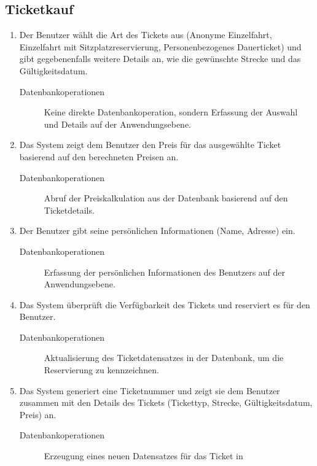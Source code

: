 \subsection{Ticketkauf}
\begin{enumerate}
    \item Der Benutzer wählt die Art des Tickets aus (Anonyme Einzelfahrt, Einzelfahrt mit
    Sitzplatzreservierung, Personenbezogenes Dauerticket) und gibt gegebenenfalls
    weitere Details an, wie die gewünschte Strecke und das Gültigkeitsdatum.
        \begin{description}
            \item[Datenbankoperationen] Keine direkte Datenbankoperation, sondern Erfassung
            der Auswahl und Details auf der Anwendungsebene.
        \end{description}
    \item Das System zeigt dem Benutzer den Preis für das ausgewählte Ticket basierend auf
    den berechneten Preisen an.
        \begin{description}
            \item[Datenbankoperationen] Abruf der Preiskalkulation aus der Datenbank basierend
            auf den Ticketdetails.
        \end{description}
    \item Der Benutzer gibt seine persönlichen Informationen (Name, Adresse) ein.
        \begin{description}
            \item[Datenbankoperationen] Erfassung der persönlichen Informationen des
            Benutzers auf der Anwendungsebene.                       
        \end{description}
    \item Das System überprüft die Verfügbarkeit des Tickets und reserviert es für den
    Benutzer.    
        \begin{description}
            \item[Datenbankoperationen] Aktualisierung des Ticketdatensatzes in der Datenbank,
            um die Reservierung zu kennzeichnen.
        \end{description}
    \item Das System generiert eine Ticketnummer und zeigt sie dem Benutzer zusammen mit
    den Details des Tickets (Tickettyp, Strecke, Gültigkeitsdatum, Preis) an.    
        \begin{description}
            \item[Datenbankoperationen] Erzeugung eines neuen Datensatzes für das Ticket in

\end{description}
\end{enumerate}
